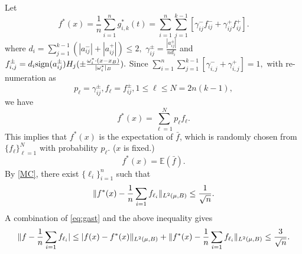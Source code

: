 Let
$$
f^*(x) = \frac1n  \sum_{i=1}^n g_{i,k}^\ast(t)
=\sum_{i=1}^n\sum_{j=1}^{k-1}[\gamma_{ij}^- f_{ij}^-+ \gamma_{ij}^+f_{ij}^+].
$$ 
where
$
d_i=\sum_{j=1}^{k-1}(|a^-_{ij}|+|a^+_{ij}|)\le 2,
$   
$
\gamma_{ij}^{\pm}=\frac{|a^\pm_{ij}|}{nd_i}
$ and
$
f^\pm_{i,j}=d_i\/{\rm sign}(a^\pm_{ij})H_j(\pm {\omega_i^\ast\cdot (x-x_B)\over |\omega_i^\ast|_B}).
$
Since
$
\displaystyle \sum_{i=1}^n\sum_{j=1}^{k-1}[\gamma_{i,j}^-+\gamma_{i,j}^+]=1,
$
with re-numeration as
$$
p_\ell=\gamma_{ij}^{\pm}, f_\ell = f_{ij}^{\pm}, 1\le \ell \le N=2n(k-1),
$$
we have
$$
f^*(x)=\sum_{\ell=1}^N p_\ell f_\ell.
$$
This implies that $f^\ast (x)$ is the expectation of $\bar f$, which is randomly chosen from $\{f_\ell\}_{\ell=1}^N$ with probability $p_\ell$. ($x$ is fixed.)
$$
f^\ast(x) = \mathbb{E} (\bar f).
$$
By \eqref{MC}, there exist $\{\ell_i\}_{i=1}^n$ such that
$$
\|f^\ast (x) - {1\over n}\sum_{i=1} f_{\ell_i}\|_{L^2(\mu,B)}\le {1\over \sqrt{n}}.
$$
A combination of \eqref{eq:gast} and the above inequality gives
$$
\|f - {1\over n}\sum_{i=1} f_{\ell_i}|\le |f(x) - f^\ast (x)\|_{L^2(\mu,B)} + \|f^\ast (x) - {1\over n}\sum_{i=1} f_{\ell_i}\|_{L^2(\mu,B)}\le{3\over \sqrt{n}}.
$$
 
\iffalse
{\bf Outline of proof}
\begin{enumerate}
\item $f(x)=\int g(x,\omega)\lambda(\omega)d\omega$
\item $\displaystyle {1\over n}\sum_{i=1}^n g(x,\omega_i)\rightarrow f(x)$ with accuracy $n^{-1/2}$, with
\[
	g(x,\omega_i)= \cos(\omega_i\cdot (x-x_B)+\theta_B(\omega_i))  -\cos(\theta_B(\omega_i)),
\]
\item $$
\displaystyle f^\ast(x)={1\over n}\sum_{i=1}^n \sum_{j=1}^{k-1}[a_{ij}^-H_j(-{x-x_B\over h})+a_{ij}^+H_{j}({x-x_B\over h})] \rightarrow {1\over n}\sum_{i=1}^n g(x,\omega_i)
$$ 
with accuracy $k^{-1}$. Let $k=n^{1/2}$. The subscript $i$ relates to sample $\omega_i$ and $j$ relates to the partition of $x$.
\item For any function $f$, there exist $\{\omega_i^\ast\}_{i=1}^n$ which determine the value of $a_{ij}^\pm$ such that
$$
|f(x) - f^\ast(x)|\le n^{-1/2}.
$$
\item Rewrite $f^\ast$ as
$$
f^\ast (x)=\sum_{l=1}^N p_lf_l \quad \mbox{ with } N=2n(k-1)
$$
with
$
\displaystyle p_l={|a_l|\over nd_l},
$
$
\displaystyle f_l=d_l\/{\rm sign}(a_l)H_l(\omega_l^B\cdot (x-x_B)).
$

Let $\bar{f}$ be a random variable, $f_l$ with probability $p_l$. Then,
$$
f^\ast (x) = \mathbb{E}(\bar f).
$$
\end{enumerate}
\fi
